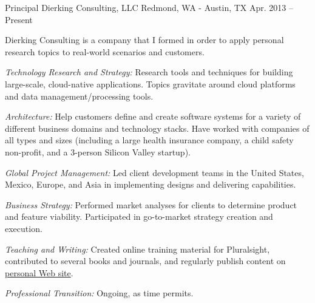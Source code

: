 \begin{cventries}
\cventry 
{Principal}
{Dierking Consulting, LLC}
{Redmond, WA - Austin, TX}
{Apr. 2013 – Present}
{ %
\begin{cvitems}
\item {Dierking Consulting is a company that I formed in order to apply personal research topics to real-world scenarios and customers.}
\item {\emph{Technology Research and Strategy:} Research tools and techniques for building large-scale, cloud-native applications. Topics gravitate around cloud platforms and data management/processing tools.}
\item {\emph{Architecture:} Help customers define and create software systems for a variety of different business domains and technology stacks.  Have worked with companies of all types and sizes (including a large health insurance company, a child safety non-profit, and a 3-person Silicon Valley startup). }
\item {\emph{Global Project Management:} Led client development teams in the United States, Mexico, Europe, and Asia in implementing designs and delivering capabilities.}
\item {\emph{Business Strategy:} Performed market analyses for clients to determine product and feature viability. Participated in go-to-market strategy creation and execution.}
\item {\emph{Teaching and Writing:} Created online training material for Pluralsight, contributed to several books and journals, and regularly publish content on \href{https://www.howarddierking.com}{personal Web site}. }
\item {\emph{Professional Transition:} Ongoing, as time permits.}
\end{cvitems}
}



\end{cventries}
